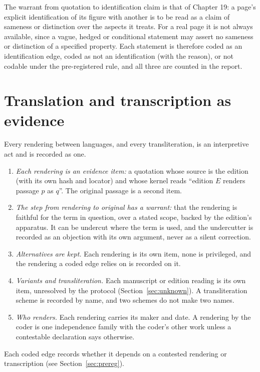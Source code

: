 \documentclass[11pt]{article}
\begin{document}
The warrant from quotation to identification claim is that of Chapter 19: a page's explicit identification of its figure with another is to be read as a claim of sameness or distinction over the aspects it treats. For a real page it is not always available, since a vague, hedged or conditional statement may assert no sameness or distinction of a specified property. Each statement is therefore coded as an identification edge, coded as not an identification (with the reason), or not codable under the pre-registered rule, and all three are counted in the report.

\section{Translation and transcription as evidence}\label{sec:translation}

Every rendering between languages, and every transliteration, is an interpretive act and is recorded as one.

\begin{enumerate}[label=(T\arabic*),nosep]
\item \emph{Each rendering is an evidence item:} a quotation whose source is the edition (with its own hash and locator) and whose kernel reads ``edition $E$ renders passage $p$ as $q$''. The original passage is a second item.
\item \emph{The step from rendering to original has a warrant:} that the rendering is faithful for the term in question, over a stated scope, backed by the edition's apparatus. It can be undercut where the term is used, and the undercutter is recorded as an objection with its own argument, never as a silent correction.
\item \emph{Alternatives are kept.} Each rendering is its own item, none is privileged, and the rendering a coded edge relies on is recorded on it.
\item \emph{Variants and transliteration.} Each manuscript or edition reading is its own item, unresolved by the protocol (Section~\ref{sec:unknown}). A transliteration scheme is recorded by name, and two schemes do not make two names.
\item \emph{Who renders.} Each rendering carries its maker and date. A rendering by the coder is one independence family with the coder's other work unless a contestable declaration says otherwise.
\end{enumerate}

Each coded edge records whether it depends on a contested rendering or transcription (see Section~\ref{sec:prereg}).
\end{document}
